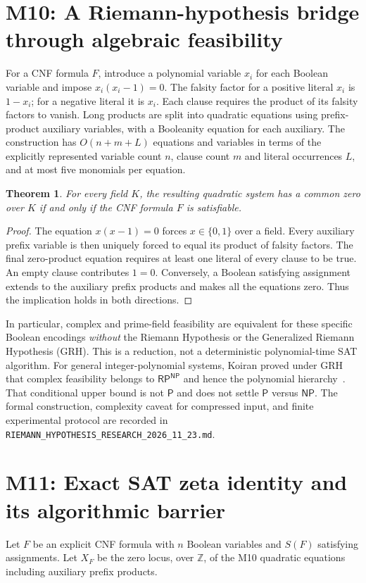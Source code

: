 \documentclass[11pt,a4paper]{article}
\newtheorem{theorem}{Theorem}
\begin{document}
\section{M10: A Riemann-hypothesis bridge through algebraic feasibility}
For a CNF formula $F$, introduce a polynomial variable $x_i$
for each Boolean variable and impose $x_i(x_i-1)=0$.
The falsity factor for a positive literal $x_i$ is $1-x_i$;
for a negative literal it is $x_i$. Each clause requires the product
of its falsity factors to vanish. Long products are split into
quadratic equations using prefix-product auxiliary variables, with
a Booleanity equation for each auxiliary. The construction has
$O(n+m+L)$ equations and variables in terms of the explicitly
represented variable count $n$, clause count $m$ and literal
occurrences $L$, and at most five monomials per equation.

\begin{theorem}
For every field $K$, the resulting quadratic system has a common
zero over $K$ if and only if the CNF formula $F$ is satisfiable.
\end{theorem}
\begin{proof}
The equation $x(x-1)=0$ forces $x\in\{0,1\}$ over a field.
Every auxiliary prefix variable is then uniquely forced to equal
its product of falsity factors. The final zero-product equation
requires at least one literal of every clause to be true. An
empty clause contributes $1=0$. Conversely, a Boolean satisfying
assignment extends to the auxiliary prefix products and makes all
the equations zero. Thus the implication holds in both directions.
\end{proof}

In particular, complex and prime-field feasibility are equivalent
for these specific Boolean encodings \emph{without} the Riemann
Hypothesis or the Generalized Riemann Hypothesis (GRH). This is
a reduction, not a deterministic polynomial-time SAT algorithm.
For general integer-polynomial systems, Koiran proved under GRH
that complex feasibility belongs to $\mathsf{RP}^{\mathsf{NP}}$
and hence the polynomial hierarchy~\cite{koiran}. That
conditional upper bound is not $\mathsf{P}$ and does not settle
$\mathsf{P}$ versus $\mathsf{NP}$. The formal construction,
complexity caveat for compressed input, and finite experimental
protocol are recorded in
\texttt{RIEMANN\_HYPOTHESIS\_RESEARCH\_2026\_11\_23.md}.

\section{M11: Exact SAT zeta identity and its algorithmic barrier}
Let $F$ be an explicit CNF formula with $n$ Boolean variables
and $S(F)$ satisfying assignments. Let $X_F$ be the zero locus,
over $\mathbb Z$, of the M10 quadratic equations including
auxiliary prefix products.
\end{document}
